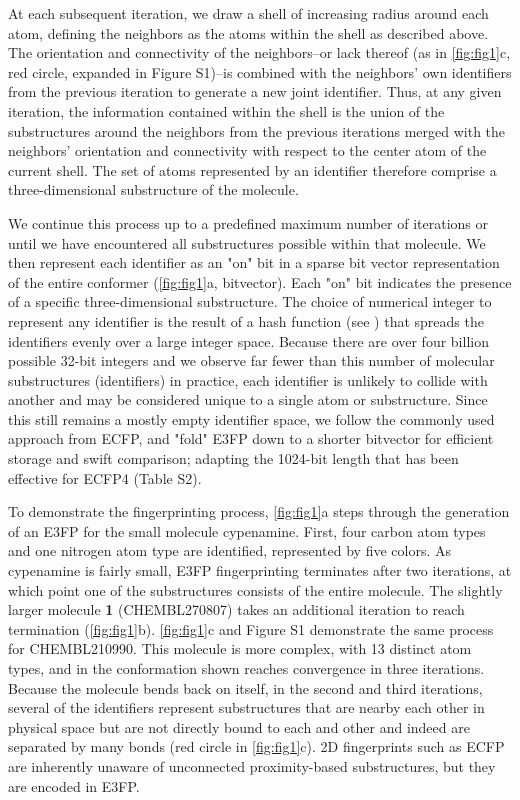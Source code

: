 \documentclass[../../main.tex]{subfiles}
\begin{document}
\begin{refsection}
	At each subsequent iteration, we draw a shell of increasing radius around each atom, defining the neighbors as the atoms within the shell as described above.
	The orientation and connectivity of the neighbors--or lack thereof (as in \cref{fig:fig1}c, red circle, expanded in Figure S1)--is combined with the neighbors' own identifiers from the previous iteration to generate a new joint identifier.
	Thus, at any given iteration, the information contained within the shell is the union of the substructures around the neighbors from the previous iterations merged with the neighbors' orientation and connectivity with respect to the center atom of the current shell.
	The set of atoms represented by an identifier therefore comprise a three-dimensional substructure of the molecule.

	We continue this process up to a predefined maximum number of iterations or until we have encountered all substructures possible within that molecule.
	We then represent each identifier as an "on" bit in a sparse bit vector representation of the entire conformer (\cref{fig:fig1}a, bitvector).
	Each "on" bit indicates the presence of a specific three-dimensional substructure.
	The choice of numerical integer to represent any identifier is the result of a hash function (see  ) that spreads the identifiers evenly over a large integer space.
	Because there are over four billion possible 32-bit integers and we observe far fewer than this number of molecular substructures (identifiers) in practice, each identifier is unlikely to collide with another and may be considered unique to a single atom or substructure.
	Since this still remains a mostly empty identifier space, we follow the commonly used approach from ECFP, and "fold" E3FP down to a shorter bitvector for efficient storage and swift comparison; adapting the 1024-bit length that has been effective for ECFP4  \supercite{hert_2008,hert_2004} (Table S2).

	To demonstrate the fingerprinting process, \cref{fig:fig1}a steps through the generation of an E3FP for the small molecule cypenamine.
	First, four carbon atom types and one nitrogen atom type are identified, represented by five colors.
	As cypenamine is fairly small, E3FP fingerprinting terminates after two iterations, at which point one of the substructures consists of the entire molecule.
	The slightly larger molecule \textbf{1} (CHEMBL270807) takes an additional iteration to reach termination  (\cref{fig:fig1}b).
	\cref{fig:fig1}c and Figure S1 demonstrate the same process for CHEMBL210990.
	This molecule is more complex, with 13 distinct atom types, and in the conformation shown reaches convergence in three iterations.
	Because the molecule bends back on itself, in the second and third iterations, several of the identifiers represent substructures that are nearby each other in physical space but are not directly bound to each and other and indeed are separated by many bonds (\eg red circle in \cref{fig:fig1}c).
	2D fingerprints such as ECFP are inherently unaware of unconnected proximity-based substructures, but they are encoded in E3FP.



\end{refsection}
\end{document}
